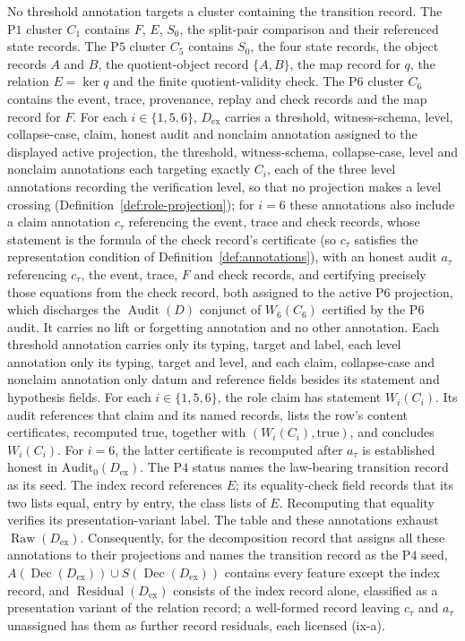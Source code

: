 \documentclass[11pt]{article}
\theoremstyle{definition}
\newcommand{\Raw}[1]{\ensuremath{\operatorname{Raw}\!\left(#1\right)}}
\newcommand{\Audit}[1]{\ensuremath{\operatorname{Audit}\!\left(#1\right)}}
\newcommand{\Dec}[1]{\ensuremath{\operatorname{Dec}\!\left(#1\right)}}
\newcommand{\Residual}[1]{\ensuremath{\operatorname{Residual}\!\left(#1\right)}}
\newcommand{\Pone}{\ensuremath{\mathrm{P1}}}
\newcommand{\Pfour}{\ensuremath{\mathrm{P4}}}
\newcommand{\Pfive}{\ensuremath{\mathrm{P5}}}
\newcommand{\Psix}{\ensuremath{\mathrm{P6}}}
\begin{document}
No threshold annotation targets a cluster containing the transition record. The \Pone{}
cluster \(C_1\) contains \(F\), \(E\), \(S_0\), the split-pair comparison and their referenced
state records. The \Pfive{} cluster \(C_5\) contains \(S_0\), the four state records, the object
records \(A\) and \(B\), the quotient-object record \(\{A,B\}\), the map record for \(q\), the relation
\(E=\ker q\) and the finite quotient-validity check. The \Psix{} cluster \(C_6\)
contains the event, trace, provenance, replay and check records and the map
record for \(F\). For each
\(i\in\{1,5,6\}\), \(D_{\mathrm{ex}}\) carries a threshold, witness-schema,
level, collapse-case, claim, honest audit and nonclaim annotation assigned to
the displayed active projection, the threshold, witness-schema,
collapse-case, level and nonclaim annotations each targeting exactly
\(C_i\), each of the three level annotations recording the verification level,
so that no projection makes a level crossing (Definition~\ref{def:role-projection}); for \(i=6\) these annotations also include a claim annotation
\(c_\tau\) referencing the event, trace and check records, whose statement is the formula of the check record's certificate (so \(c_\tau\) satisfies the representation condition of Definition~\ref{def:annotations}), with an
honest audit \(a_\tau\) referencing \(c_\tau\), the event, trace, \(F\) and
check records, and certifying precisely those equations from the check
record, both assigned to the active \Psix{} projection, which discharges the
\(\Audit{D}\) conjunct of \(W_6(C_6)\) certified by the \Psix{} audit. It
carries no lift or forgetting annotation and no other annotation. Each threshold annotation carries only its typing, target and label, each level annotation only its typing, target and level, and each claim, collapse-case and nonclaim annotation only datum and reference fields besides its statement and hypothesis fields. For each \(i\in\{1,5,6\}\), the role claim has statement \(W_i(C_i)\).
Its audit references that claim and its named records, lists the
row's content certificates, recomputed true, together with
\((W_i(C_i),\mathrm{true})\), and concludes \(W_i(C_i)\).
For \(i=6\), the latter certificate is recomputed after
\(a_\tau\) is established honest in \(\mathrm{Audit}_0(D_{\mathrm{ex}})\). The
\Pfour{} status names the law-bearing transition record as its seed. The index record references \(E\); its equality-check field records that its
two lists equal, entry by entry, the class lists of \(E\). Recomputing that equality
verifies its presentation-variant label. The table and
these annotations exhaust \(\Raw{D_{\mathrm{ex}}}\). Consequently, for the decomposition record that assigns all these annotations to their projections and names the transition record as the \Pfour{} seed, \(A(\Dec{D_{\mathrm{ex}}})\cup S(\Dec{D_{\mathrm{ex}}})\) contains every feature except the index record, and \(\Residual{D_{\mathrm{ex}}}\) consists of the index record alone, classified as a presentation variant of the relation record; a well-formed record leaving \(c_\tau\) and \(a_\tau\) unassigned has them as further record residuals, each licensed (ix-a).
\end{document}
